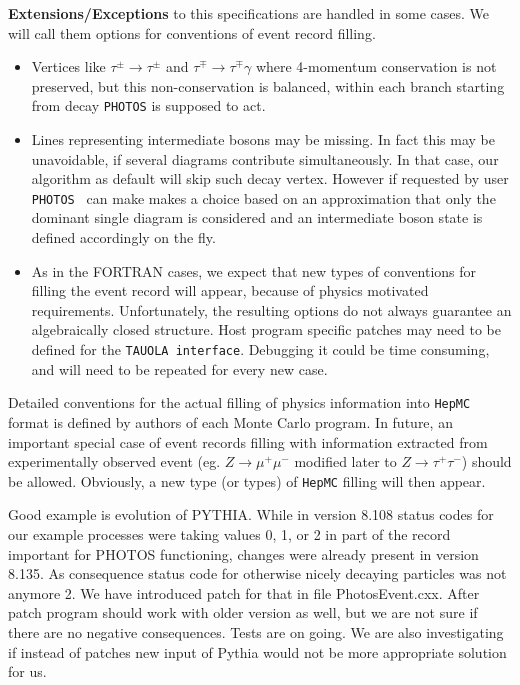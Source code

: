 \documentclass[]{Photos_interface_design}
\begin{document}
\noindent
\textbf{ Extensions/Exceptions} to this specifications  are handled in some cases. We will call them
options for conventions of event record filling.
  \begin{itemize} 
    \item  Vertices like $\tau^\pm \rightarrow \tau^\pm$ and $\tau^\mp \rightarrow \tau^\mp \gamma$ 
           where 4-momentum conservation is not preserved, but this
           non-conservation is balanced, within each branch starting from decay 
{\tt PHOTOS} is supposed to act. 
    \item  Lines representing
           intermediate bosons may be missing. In fact this may be unavoidable, if several 
           diagrams contribute simultaneously. In that case, our algorithm 
as default will skip such decay vertex. However if requested by user
{\tt PHOTOS } can make makes a choice
           based on an approximation that
           only the dominant  single diagram is considered
           and an intermediate boson state is defined accordingly on the fly. 
    \item
           As in the FORTRAN cases, we expect that  new  types of 
           conventions for filling the event record
           will appear, because of physics motivated requirements.
           Unfortunately, the resulting options do not always guarantee
           an algebraically closed structure.  
           Host program specific patches  may need to be defined for the 
           {\tt TAUOLA interface}. 
           Debugging it could be time consuming, and will need to be repeated for every new
           case.
   \end{itemize}


Detailed
conventions for the actual filling of physics information into {\tt HepMC} format
is defined by authors of each Monte Carlo program.
 In future,  an important special case of event records filling with
information extracted from experimentally observed event (eg. $Z\to \mu^+\mu^-$
 modified later to $Z\to \tau^+\tau^-$) should be allowed.
  Obviously, a new type (or types) of {\tt HepMC} filling will then appear.

Good example is evolution of PYTHIA. While in version 8.108 status codes for 
our example processes were  taking values 0, 1, or 2  in part of the record 
important for PHOTOS functioning, changes were already present in
 version 8.135. As consequence status code for 
otherwise nicely decaying particles was not anymore 2. We have introduced 
patch for that in file PhotosEvent.cxx. After patch 
program should work with older version as well, but we are not sure if there 
are no negative consequences. Tests are on going. We are also investigating 
if instead of patches new input of Pythia would not be more appropriate 
solution for us.
\end{document}
